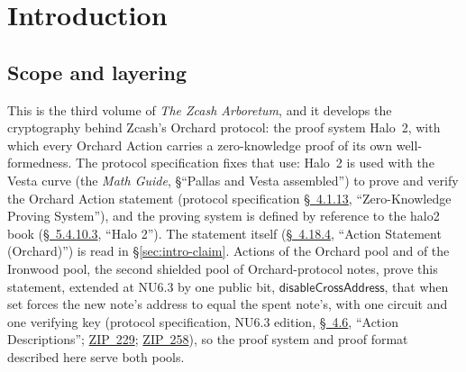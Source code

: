 \documentclass[11pt,a4paper]{article}
\theoremstyle{definition}
\begin{document}
\section{Introduction}\label{sec:intro}

\subsection{Scope and layering}\label{sec:intro-scope}

This is the third volume of \emph{The Zcash Arboretum}, and it develops
the cryptography behind Zcash's Orchard protocol: the proof system
Halo~2, with which every Orchard Action carries a zero-knowledge proof
of its own well-formedness. The protocol specification fixes that use:
Halo~2 is used with the Vesta curve (the \emph{Math Guide}, \S``Pallas
and Vesta assembled'') to prove and verify the Orchard Action statement
(protocol specification
\href{https://zips.z.cash/protocol/protocol.pdf\#abstractzk}{\S~4.1.13},
``Zero-Knowledge Proving System''), and the proving system is defined
by reference to the halo2 book
(\href{https://zips.z.cash/protocol/protocol.pdf\#halo2}{\S~5.4.10.3},
``Halo 2''). The statement itself
(\href{https://zips.z.cash/protocol/protocol.pdf\#actionstatement}{\S~4.18.4},
``Action Statement (Orchard)'') is read in \S\ref{sec:intro-claim}.
Actions of the Orchard pool and of the Ironwood pool, the second shielded
pool of Orchard-protocol notes, prove this statement, extended at NU6.3
by one public bit, $\mathsf{disableCrossAddress}$, that when set forces
the new note's address to equal the spent note's, with one circuit and
one verifying key (protocol specification, NU6.3 edition,
\href{https://zips.z.cash/protocol/nu6_3.pdf\#actiondesc}{\S~4.6},
``Action Descriptions''; \href{https://zips.z.cash/zip-0229}{ZIP~229};
\href{https://zips.z.cash/zip-0258}{ZIP~258}), so
the proof system and proof format described here serve both pools.
\end{document}
